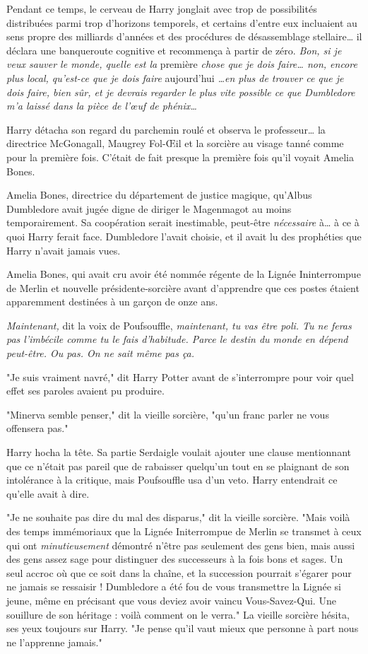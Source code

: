 Pendant ce temps, le cerveau de Harry jonglait avec trop de possibilités distribuées parmi trop d'horizons temporels, et certains d'entre eux incluaient au sens propre des milliards d'années et des procédures de désassemblage stellaire… il déclara une banqueroute cognitive et recommença à partir de zéro. \emph{Bon, si je veux sauver le monde, quelle est la}  première \emph{chose que je dois faire… non, encore plus local, qu'est-ce que je dois faire}  aujourd'hui \emph{…en plus de trouver ce que je dois faire, bien sûr, et je devrais regarder le plus vite possible ce que Dumbledore m'a laissé dans la pièce de l'œuf de phénix…} 

Harry détacha son regard du parchemin roulé et observa le professeur… la directrice McGonagall, Maugrey Fol-Œil et la sorcière au visage tanné comme pour la première fois. C'était de fait presque la première fois qu'il voyait Amelia Bones.

Amelia Bones, directrice du département de justice magique, qu'Albus Dumbledore avait jugée digne de diriger le Magenmagot au moins temporairement. Sa coopération serait inestimable, peut-être \emph{nécessaire}  à… à ce à quoi Harry ferait face. Dumbledore l'avait choisie, et il avait lu des prophéties que Harry n'avait jamais vues.

Amelia Bones, qui avait cru avoir été nommée régente de la Lignée Ininterrompue de Merlin et nouvelle présidente-sorcière avant d'apprendre que ces postes étaient apparemment destinées à un garçon de onze ans.

\emph{Maintenant,}  dit la voix de Poufsouffle, \emph{maintenant, tu vas être poli. Tu ne feras pas l'imbécile comme tu le fais d'habitude. Parce le destin du monde en dépend peut-être. Ou pas. On ne sait même pas ça.} 

"Je suis vraiment navré," dit Harry Potter avant de s'interrompre pour voir quel effet ses paroles avaient pu produire.

"Minerva semble penser," dit la vieille sorcière, "qu'un franc parler ne vous offensera pas."

Harry hocha la tête. Sa partie Serdaigle voulait ajouter une clause mentionnant que ce n'était pas pareil que de rabaisser quelqu'un tout en se plaignant de son intolérance à la critique, mais Poufsouffle usa d'un veto. Harry entendrait ce qu'elle avait à dire.

"Je ne souhaite pas dire du mal des disparus," dit la vieille sorcière. "Mais voilà des temps immémoriaux que la Lignée Initerrompue de Merlin se transmet à ceux qui ont \emph{minutieusement}  démontré n'être pas seulement des gens bien, mais aussi des gens assez sage pour distinguer des successeurs à la fois bons et sages. Un seul accroc où que ce soit dans la chaîne, et la succession pourrait s'égarer pour ne jamais se ressaisir ! Dumbledore a été fou de vous transmettre la Lignée si jeune, même en précisant que vous deviez avoir vaincu Vous-Savez-Qui. Une souillure de son héritage : voilà comment on le verra." La vieille sorcière hésita, ses yeux toujours sur Harry. "Je pense qu'il vaut mieux que personne à part nous ne l'apprenne jamais."


